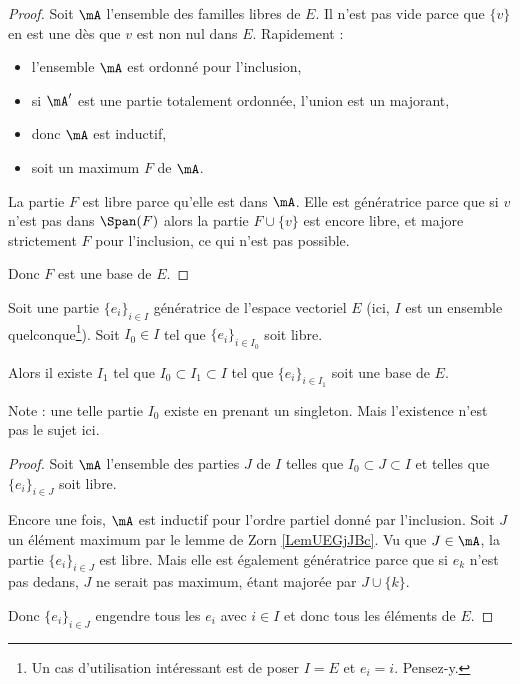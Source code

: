 \begin{proof}
	Soit \( \mA\) l'ensemble des familles libres de \( E\). Il n'est pas vide parce que \( \{ v \}\) en est une dès que \( v\) est non nul dans \( E\). Rapidement :
	\begin{itemize}
		\item l'ensemble \( \mA\) est ordonné pour l'inclusion,
		\item si \( \mA'\) est une partie totalement ordonnée, l'union est un majorant,
		\item donc \( \mA\) est inductif,
		\item soit un maximum \( F\) de \( \mA\).
	\end{itemize}
	La partie \( F\) est libre parce qu'elle est dans \( \mA\). Elle est génératrice parce que si \( v\) n'est pas dans \( \Span(F)\) alors la partie \( F\cup\{ v \}\) est encore libre, et majore strictement $F$ pour l'inclusion, ce qui n'est pas possible.

	Donc \( F\) est une base de \( E\).
\end{proof}

\begin{theorem}      \label{THOooOQLQooHqEeDK}
	Soit une partie \( \{ e_i \}_{i\in I}\) génératrice de l'espace vectoriel \( E\) (ici, \( I\) est un ensemble quelconque\footnote{Un cas d'utilisation intéressant est de poser \( I=E\) et \( e_i=i\). Pensez-y.}). Soit \( I_0\in I\) tel que \( \{ e_i \}_{i\in I_0}\) soit libre.

	Alors il existe \( I_1\) tel que \( I_0\subset I_1\subset I\) tel que \( \{ e_i \}_{i\in I_1}\) soit une base de \( E\).
\end{theorem}

Note : une telle partie \( I_0\) existe en prenant un singleton. Mais l'existence n'est pas le sujet ici.

\begin{proof}
	Soit \( \mA\) l'ensemble des parties \( J\) de \( I\) telles que \( I_0\subset J\subset I\) et telles que \( \{ e_i \}_{i\in J}\) soit libre.

	Encore une fois, \( \mA\) est inductif pour l'ordre partiel donné par l'inclusion. Soit \( J\) un élément maximum par le lemme de Zorn \ref{LemUEGjJBc}. Vu que \( J\in\mA\), la partie \( \{ e_i \}_{i\in J}\) est libre. Mais elle est également génératrice parce que si \( e_k\) n'est pas dedans, \( J\) ne serait pas maximum, étant majorée par \( J\cup\{ k \}\).

	Donc \( \{ e_i \}_{i\in J}\) engendre tous les \( e_i\) avec \( i\in I\) et donc tous les éléments de \( E\).
\end{proof}

